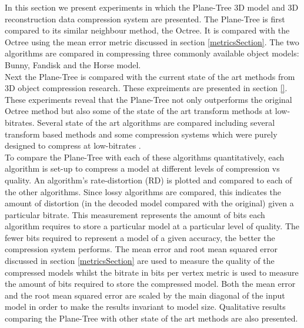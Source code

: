 
In this section we present experiments in which the Plane-Tree 3D model and 3D reconstruction data compression system are presented. The Plane-Tree is first compared to its similar neighbour method, the Octree. It is compared with the Octree using the mean error metric discussed in section \ref{metricsSection}. The two algorithms are compared in compressing three commonly available object models: Bunny, Fandisk and the Horse model. \\

Next the Plane-Tree is compared with the current state of the art methods from 3D object compression research. These expreiments are presented in section \ref{}. These experiments reveal that the Plane-Tree not only outperforms the original Octree method but also some of the state of the art transform methods at low-bitrates. Several state of the art algorithms are compared including several transform based methods \cite{Khodakovsky00Progressive,Bayazit103DMesh} and some compression systems which were purely designed to compress at low-bitrates \cite{Peng10Feature}. \\ 

To compare the Plane-Tree with each of these algorithms quantitatively, each algorithm is set-up to compress a model at different levels of compression vs quality. An algorithm's rate-distortion (RD) is plotted and compared to each of the other algorithms. Since lossy algorithms are compared, this indicates the amount of distortion (in the decoded model compared with the original) given a particular bitrate. This measurement represents the amount of bits each algorithm requires to store a particular model at a particular level of quality. The fewer bits required to represent a model of a given accuracy, the better the compression system performs. The mean error and root mean squared error discussed in section \ref{metricsSection} are used to measure the quality of the compressed models whilst the bitrate in bits per vertex metric is used to measure the amount of bits required to store the compressed model. Both the mean error and the root mean squared error are scaled by the main diagonal of the input model in order to make the results invariant to model size. Qualitative results comparing the Plane-Tree with other state of the art methods are also presented. \\

